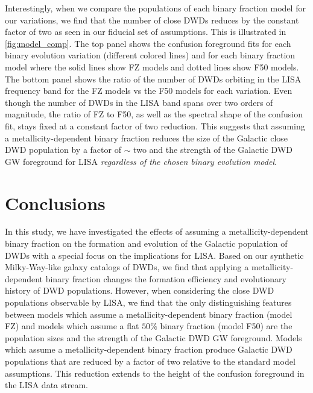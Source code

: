 \documentclass[twocolumn, linenumbers]{aastex631}
\begin{document}
Interestingly, when we compare the populations of each binary fraction model for our variations, we find that the number of close DWDs reduces by the constant factor of two as seen in our fiducial set of assumptions. This is illustrated in \ref{fig:model_comp}. The top panel shows the confusion foreground fits for each binary evolution variation (different colored lines) and for each binary fraction model where the solid lines show FZ models and dotted lines show F50 models. The bottom panel shows the ratio of the number of DWDs orbiting in the LISA frequency band for the FZ models vs the F50 models for each variation. Even though the number of DWDs in the LISA band spans over two orders of magnitude, the ratio of FZ to F50, as well as the spectral shape of the confusion fit, stays fixed at a constant factor of two reduction. This suggests that assuming a metallicity-dependent binary fraction reduces the size of the Galactic close DWD population by a factor of $\sim$ two and the strength of the Galactic DWD GW foreground for LISA \emph{regardless of the chosen binary evolution model}.

\section{Conclusions}\label{sec:conclusions}
In this study, we have investigated the effects of assuming a metallicity-dependent binary fraction on the formation and evolution of the Galactic population of DWDs with a special focus on the implications for LISA. Based on our synthetic Milky-Way-like galaxy catalogs of DWDs, we find that applying a metallicity-dependent binary fraction changes the formation efficiency and evolutionary history of DWD populations. However, when considering the close DWD populations observable by LISA, we find that the only distinguishing features between models which assume a metallicity-dependent binary fraction (model FZ) and models which assume a flat $50\%$ binary fraction (model F50) are the population sizes and the strength of the Galactic DWD GW foreground. Models which assume a metallicity-dependent binary fraction produce Galactic DWD populations that are reduced by a factor of two relative to the standard model assumptions. This reduction extends to the height of the confusion foreground in the LISA data stream. 
\end{document}
